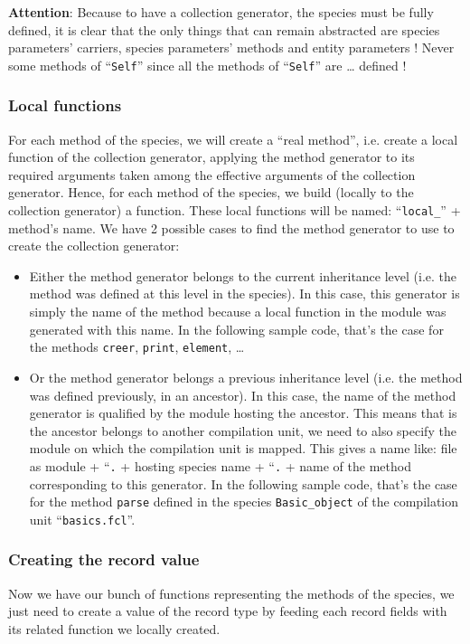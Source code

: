 {\bf Attention}: Because to have a collection generator, the species
must be fully defined, it is clear that the only things that can
remain abstracted are species parameters' carriers, species
parameters' methods and entity parameters ! Never some methods of
``{\tt Self}'' since all the methods of ``{\tt Self}'' are \ldots
defined !


\subsubsection{Local functions}
For each method of the species, we will create a ``real method'',
i.e. create a local function of the collection generator, applying the
method generator to its required arguments taken among the effective
arguments of the collection generator. Hence, for each method of the
species, we build (locally to the collection generator) a function.
These local functions will be named: ``{\tt local\_}'' + method's
name. We have 2 possible cases to find the method generator to use to
create the collection generator:
\begin{itemize}
  \item Either the method generator belongs to the current inheritance
    level (i.e. the method was defined at this level in the species).
    In this case, this generator is simply the name of the method
    because a local function in the module was generated with this
    name. In the following sample code, that's the case for the
    methods {\tt creer}, {\tt print}, {\tt element}, \ldots
  \item Or the method generator belongs a previous inheritance level
    (i.e. the method was defined previously, in an ancestor). In this
    case, the name of the method generator is qualified by the module
    hosting the ancestor. This means that is the ancestor belongs to
    another compilation unit, we need to also specify the module on
    which the compilation unit is mapped. This gives a name like:
    file as module + ``{\tt .} + hosting species name + ``{\tt .} +
    name of the method corresponding to this generator.
    In the following sample code, that's the case for the method
    {\tt parse} defined in the species {\tt Basic\_object} of the
    compilation unit ``{\tt basics.fcl}''.
\end{itemize}


\subsubsection{Creating the record value}
Now we have our bunch of functions representing the methods of the
species, we just need to create a value of the record type by feeding
each record fields with its related function we locally created.

